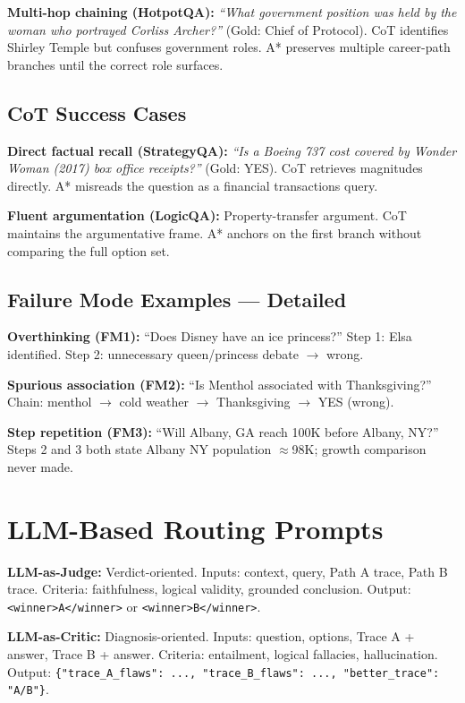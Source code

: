 \documentclass[11pt]{article}
\begin{document}
\noindent\textbf{Multi-hop chaining (HotpotQA):}
\textit{``What government position was held by the woman who portrayed Corliss Archer?''} (Gold: Chief of Protocol). CoT identifies Shirley Temple but confuses government roles. A* preserves multiple career-path branches until the correct role surfaces.

\subsection{CoT Success Cases}

\noindent\textbf{Direct factual recall (StrategyQA):}
\textit{``Is a Boeing 737 cost covered by Wonder Woman (2017) box office receipts?''} (Gold: YES). CoT retrieves magnitudes directly. A* misreads the question as a financial transactions query.

\noindent\textbf{Fluent argumentation (LogicQA):}
Property-transfer argument. CoT maintains the argumentative frame. A* anchors on the first branch without comparing the full option set.

\subsection{Failure Mode Examples — Detailed}

\noindent\textbf{Overthinking (FM1):} ``Does Disney have an ice princess?'' Step 1: Elsa identified. Step 2: unnecessary queen/princess debate $\to$ wrong.

\noindent\textbf{Spurious association (FM2):} ``Is Menthol associated with Thanksgiving?'' Chain: menthol $\to$ cold weather $\to$ Thanksgiving $\to$ YES (wrong).

\noindent\textbf{Step repetition (FM3):} ``Will Albany, GA reach 100K before Albany, NY?'' Steps 2 and 3 both state Albany NY population $\approx$98K; growth comparison never made.

\section{LLM-Based Routing Prompts}
\label{app:prompts}

\textbf{LLM-as-Judge:} Verdict-oriented. Inputs: context, query, Path A trace, Path B trace. Criteria: faithfulness, logical validity, grounded conclusion. Output: \texttt{<winner>A</winner>} or \texttt{<winner>B</winner>}.

\textbf{LLM-as-Critic:} Diagnosis-oriented. Inputs: question, options, Trace A + answer, Trace B + answer. Criteria: entailment, logical fallacies, hallucination. Output: \texttt{\{"trace\_A\_flaws": ..., "trace\_B\_flaws": ..., "better\_trace": "A/B"\}}.
\end{document}
